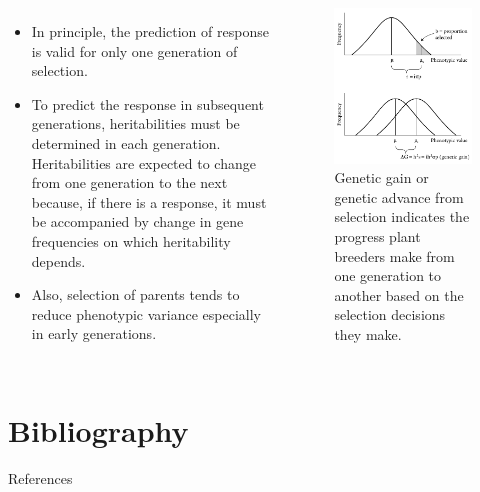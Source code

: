 \documentclass[11pt,ignorenonframetext,aspectratio=169]{beamer}
\newif\ifbibliography
\providecommand{\tightlist}{%
  \setlength{\itemsep}{0pt}\setlength{\parskip}{0pt}}
\newcommand{\bcolumns}{\begin{columns}[T, onlytextwidth]}
\newcommand{\ecolumns}{\end{columns}}
\begin{document}
\begin{frame}{}
\protect\hypertarget{section-4}{}
\bcolumns
{}

\begin{itemize}
\tightlist
\item
  In principle, the prediction of response is valid for only one
  generation of selection.
\item
  To predict the response in subsequent generations, heritabilities must
  be determined in each generation. Heritabilities are expected to
  change from one generation to the next because, if there is a
  response, it must be accompanied by change in gene frequencies on
  which heritability depends.
\item
  Also, selection of parents tends to reduce phenotypic variance
  especially in early generations.
\end{itemize}


\begin{figure}

{\centering \includegraphics[width=0.7\linewidth]{./images/response_to_selection} 

}

\caption{Genetic gain or genetic advance from selection indicates the progress plant breeders make from one generation to another based on the selection decisions they make.}\label{fig:response-to-selection}
\end{figure}

\ecolumns
\end{frame}

\hypertarget{bibliography}{%
\section{Bibliography}\label{bibliography}}

\begin{frame}{References}
\protect\hypertarget{references}{}
\end{frame}

          \begin{frame}[allowframebreaks]{}
    \bibliographytrue
    
    \end{frame}
  
\end{document}
